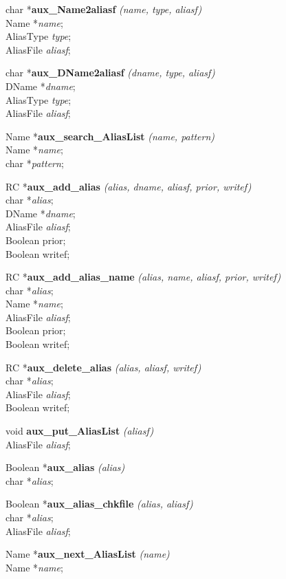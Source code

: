 char *{\bf aux\_Name2aliasf} {\em (name, type, aliasf)} \\
Name *{\em name}; \\
AliasType {\em type}; \\
AliasFile {\em aliasf};

char *{\bf aux\_DName2aliasf} {\em (dname, type, aliasf)} \\
DName *{\em dname}; \\
AliasType {\em type}; \\
AliasFile {\em aliasf};

Name *{\bf aux\_search\_AliasList} {\em (name, pattern)} \\
Name *{\em name}; \\
char *{\em pattern};

RC *{\bf aux\_add\_alias} {\em (alias, dname, aliasf, prior, writef)} \\
char *{\em alias}; \\ 
DName *{\em dname}; \\
AliasFile {\em aliasf}; \\
Boolean prior; \\
Boolean writef;

RC *{\bf aux\_add\_alias\_name} {\em (alias, name, aliasf, prior, writef)} \\
char *{\em alias}; \\ 
Name *{\em name}; \\
AliasFile {\em aliasf}; \\
Boolean prior; \\
Boolean writef;

RC *{\bf aux\_delete\_alias} {\em (alias, aliasf, writef)} \\
char *{\em alias}; \\
AliasFile {\em aliasf}; \\
Boolean writef;

void {\bf aux\_put\_AliasList} {\em (aliasf)} \\
AliasFile {\em aliasf}; 

Boolean *{\bf aux\_alias} {\em (alias)} \\
char *{\em alias}; 

Boolean *{\bf aux\_alias\_chkfile} {\em (alias, aliasf)} \\
char *{\em alias}; \\
AliasFile {\em aliasf};

Name *{\bf aux\_next\_AliasList} {\em (name)} \\
Name *{\em name};

